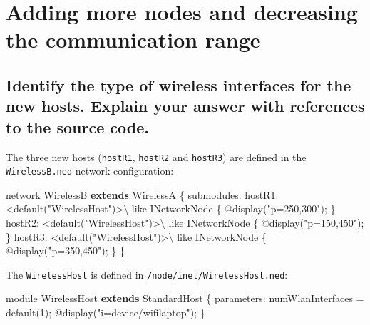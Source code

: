 \documentclass[
  letterpaper,
  DIV=11,
  numbers=noendperiod]{scrartcl}
\newenvironment{Shaded}{\begin{snugshade}}{\end{snugshade}}
\newcommand{\DataTypeTok}[1]{\textcolor[rgb]{0.68,0.00,0.00}{#1}}
\newcommand{\DecValTok}[1]{\textcolor[rgb]{0.68,0.00,0.00}{#1}}
\newcommand{\FunctionTok}[1]{\textcolor[rgb]{0.28,0.35,0.67}{#1}}
\newcommand{\ImportTok}[1]{\textcolor[rgb]{0.00,0.46,0.62}{#1}}
\newcommand{\KeywordTok}[1]{\textcolor[rgb]{0.00,0.23,0.31}{\textbf{#1}}}
\newcommand{\NormalTok}[1]{\textcolor[rgb]{0.00,0.23,0.31}{#1}}
\newcommand{\OperatorTok}[1]{\textcolor[rgb]{0.37,0.37,0.37}{#1}}
\newcommand{\StringTok}[1]{\textcolor[rgb]{0.13,0.47,0.30}{#1}}
\begin{document}
\section{Adding more nodes and decreasing the communication
range}\label{adding-more-nodes-and-decreasing-the-communication-range}

\subsection{Identify the type of wireless interfaces for the new hosts.
Explain your answer with references to the source
code.}\label{identify-the-type-of-wireless-interfaces-for-the-new-hosts.-explain-your-answer-with-references-to-the-source-code.}

The three new hosts (\texttt{hostR1}, \texttt{hostR2} and
\texttt{hostR3}) are defined in the \texttt{WirelessB.ned} network
configuration:

\begin{Shaded}
\begin{Highlighting}[]
\NormalTok{network WirelessB }\KeywordTok{extends}\NormalTok{ WirelessA}
\NormalTok{\{}
  \DataTypeTok{submodules}\OperatorTok{:}
    \DataTypeTok{hostR1}\OperatorTok{:} \OperatorTok{\textless{}}\ImportTok{default}\NormalTok{(}\StringTok{"WirelessHost"}\NormalTok{)}\OperatorTok{\textgreater{}}\NormalTok{\textbackslash{}}
\NormalTok{      like INetworkNode \{}
\NormalTok{        @}\FunctionTok{display}\NormalTok{(}\StringTok{"p=250,300"}\NormalTok{)}\OperatorTok{;}
\NormalTok{    \}}
    \DataTypeTok{hostR2}\OperatorTok{:} \OperatorTok{\textless{}}\ImportTok{default}\NormalTok{(}\StringTok{"WirelessHost"}\NormalTok{)}\OperatorTok{\textgreater{}}\NormalTok{\textbackslash{}}
\NormalTok{      like INetworkNode \{}
\NormalTok{        @}\FunctionTok{display}\NormalTok{(}\StringTok{"p=150,450"}\NormalTok{)}\OperatorTok{;}
\NormalTok{    \}}
    \DataTypeTok{hostR3}\OperatorTok{:} \OperatorTok{\textless{}}\ImportTok{default}\NormalTok{(}\StringTok{"WirelessHost"}\NormalTok{)}\OperatorTok{\textgreater{}}\NormalTok{\textbackslash{}}
\NormalTok{      like INetworkNode \{}
\NormalTok{        @}\FunctionTok{display}\NormalTok{(}\StringTok{"p=350,450"}\NormalTok{)}\OperatorTok{;}
\NormalTok{    \}}
\NormalTok{\}}
\end{Highlighting}
\end{Shaded}

The \texttt{WirelessHost} is defined in
\texttt{/node/inet/WirelessHost.ned}:

\begin{Shaded}
\begin{Highlighting}[]
\NormalTok{module WirelessHost }\KeywordTok{extends}\NormalTok{ StandardHost}
\NormalTok{\{}
    \DataTypeTok{parameters}\OperatorTok{:}
\NormalTok{        numWlanInterfaces }\OperatorTok{=} \ImportTok{default}\NormalTok{(}\DecValTok{1}\NormalTok{)}\OperatorTok{;}
\NormalTok{        @}\FunctionTok{display}\NormalTok{(}\StringTok{"i=device/wifilaptop"}\NormalTok{)}\OperatorTok{;}
\NormalTok{\}}
\end{Highlighting}
\end{Shaded}
\end{document}
